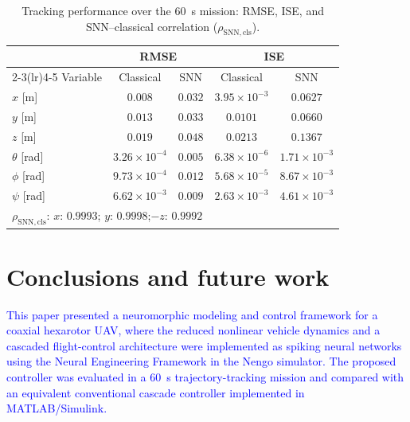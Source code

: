 \documentclass[conference]{IEEEtran}
\begin{document}
\begin{table}[h!]

\caption{Tracking performance over the $60$~s mission: RMSE, ISE, and SNN--classical correlation ($\rho_{\mathrm{SNN,cls}}$).}
\label{tab:benchmark}
\centering
\footnotesize
\setlength{\tabcolsep}{4.5pt}
\begin{tabular}{lcccc}
\toprule
 & \multicolumn{2}{c}{RMSE} & \multicolumn{2}{c}{ISE} \\
\cmidrule(lr){2-3}\cmidrule(lr){4-5}
Variable & Classical & SNN & Classical & SNN \\
\midrule
$x$ [m]        & $0.008$ & $0.032$ & $3.95 \times 10^{-3}$ & $0.0627$ \\
$y$ [m]        & $0.013$ & $0.033$ & $0.0101$ & $0.0660$ \\
$z$ [m]       & $0.019$ & $0.048$ & $0.0213$ & $0.1367$ \\
$\theta$ [rad] & $3 . 26 \times 10^{-4}$ & $0.005$ & $6.38 \times 10^{-6}$ & $1 . 71 \times 10^{-3}$ \\
$\phi$ [rad]   & $9 . 73 \times 10^ {-4}$ & $0.012$ & $5.68 \times 10^{-5}$ & $8 . 67 \times 10^{-3}$ \\
$\psi$ [rad]   & $6 . 62 \times 10 ^{-3}$ & $0.009$ & $2.63 \times 10^{-3}$ & $4 . 61 \times 10^{-3}$ \\
\midrule
\multicolumn{5}{l}{$\rho_{\mathrm{SNN,cls}}$:\; $x$: $0.9993$;\quad
$y$: $0.9998$;\quad $-z$: $0.9992$}\\
\bottomrule
\end{tabular}
\end{table}

\section{Conclusions and future work}\label{Conclusions}
\textcolor{blue}{This paper presented a neuromorphic modeling and control framework for a coaxial hexarotor UAV, where the reduced nonlinear vehicle dynamics and a cascaded flight-control architecture were implemented as spiking neural networks using the Neural Engineering Framework in the Nengo simulator. The proposed controller was evaluated in a $60$~s trajectory-tracking mission and compared with an equivalent conventional cascade controller implemented in MATLAB/Simulink.
}
\end{document}
